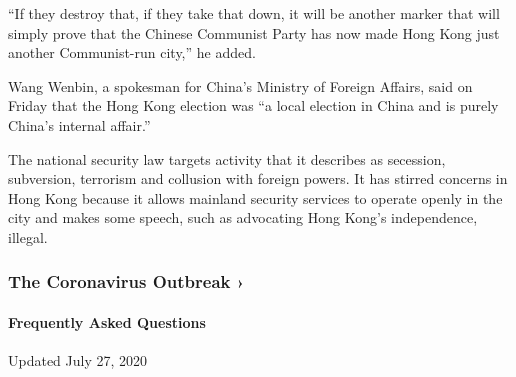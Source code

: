 ``If they destroy that, if they take that down, it will be another
marker that will simply prove that the Chinese Communist Party has now
made Hong Kong just another Communist-run city,'' he added.

Wang Wenbin, a spokesman for China's Ministry of Foreign Affairs, said
on Friday that the Hong Kong election was ``a local election in China
and is purely China's internal affair.''

The national security law targets activity that it describes as
secession, subversion, terrorism and collusion with foreign powers. It
has stirred concerns in Hong Kong because it allows mainland security
services to operate openly in the city and makes some speech, such as
advocating Hong Kong's independence, illegal.

\href{https://www.nytimes.com/news-event/coronavirus?action=click\&pgtype=Article\&state=default\&region=MAIN_CONTENT_3\&context=storylines_faq}{}

\hypertarget{the-coronavirus-outbreak-}{%
\subsubsection{The Coronavirus Outbreak
›}\label{the-coronavirus-outbreak-}}

\hypertarget{frequently-asked-questions}{%
\paragraph{Frequently Asked
Questions}\label{frequently-asked-questions}}

Updated July 27, 2020

